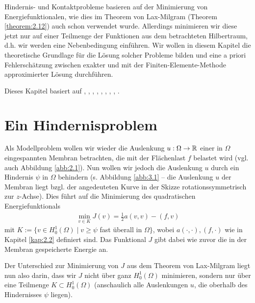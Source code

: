 \label{kap:3}

Hindernis- und Kontaktprobleme basieren auf der Minimierung von Energiefunktionalen, wie dies im Theorem von Lax-Milgram (Theorem \ref{theorem:2.12}) auch schon verwendet wurde. Allerdings minimieren wir diese jetzt nur auf einer Teilmenge der Funktionen aus dem betrachteten Hilbertraum, d.h. wir werden eine Nebenbedingung einführen. Wir wollen in diesem Kapitel die theoretische Grundlage für die Lösung solcher Probleme bilden und eine a priori Fehlerschätzung zwischen exakter und mit der Finiten-Elemente-Methode approximierter Lösung durchführen.

Dieses Kapitel basiert auf \cite{KikOden}, \cite{StarkeVar}, \cite{EPS}, \cite{EPSContact}, \cite{WriggersFEM}, \cite{WriggersContact}, \cite{HlaHas}, \cite{Glow}, \cite{Falk}.

\section{Ein Hindernisproblem}
\label{kap:3.1}


Als Modellproblem wollen wir wieder die Auslenkung $u:\Omega \rightarrow \mathbb{R}$ einer in $\Omega$ eingespannten Membran betrachten, die mit der Flächenlast $f$ belastet wird (vgl. auch Abbildung \ref{abb:2.1}). Nun wollen wir jedoch die Auslenkung $u$ durch ein Hindernis $\psi$ in $\Omega$ behindern (s. Abbildung \ref{abb:3.1} -- die Auslenkung $u$ der Membran liegt bzgl. der angedeuteten Kurve in der Skizze rotationssymmetrisch zur $z$-Achse). Dies führt auf die Minimierung des quadratischen Energiefunktionals
\begin{align}\label{eq:3.1}
\min_{v\in K} J(v) = \frac 1 2 a(v,v)-(f,v)
\end{align}
mit $K := \{v \in H^1_0(\Omega) \mid v\ge \psi$ fast überall in $\Omega\}$, wobei $a(\cdot,\cdot), (f,\cdot)$ wie in Kapitel \ref{kap:2.2} definiert sind. Das Funktional $J$ gibt dabei wie zuvor die in der Membran gespeicherte Energie an.


Der Unterschied zur Minimierung von $J$ aus dem Theorem von Lax-Milgram liegt nun also darin, dass wir $J$ nicht über ganz $H^1_0(\Omega)$ minimieren, sondern nur über eine Teilmenge $K\subset H^1_0(\Omega)$ (anschaulich alle Auslenkungen $u$, die oberhalb des Hindernisses $\psi$ liegen).



